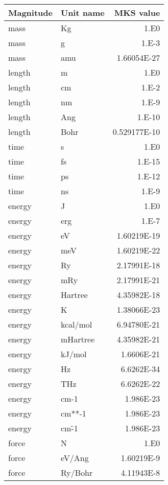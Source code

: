 \documentclass[11pt]{article}
\begin{document}
\begin{center}
\begin{tabular}{llr}
Magnitude & Unit name & MKS value \\
\hline  
mass     & Kg         & 1.E0 \\
mass     & g          & 1.E-3 \\
mass     & amu        & 1.66054E-27 \\
length   & m          & 1.E0 \\
length   & cm         & 1.E-2 \\
length   & nm         & 1.E-9 \\
length   & Ang        & 1.E-10 \\
length   & Bohr       & 0.529177E-10 \\
time     & s          & 1.E0 \\
time     & fs         & 1.E-15 \\
time     & ps         & 1.E-12 \\
time     & ns         & 1.E-9 \\
energy   & J          & 1.E0 \\
energy   & erg        & 1.E-7 \\
energy   & eV         & 1.60219E-19 \\
energy   & meV        & 1.60219E-22 \\
energy   & Ry         & 2.17991E-18 \\
energy   & mRy        & 2.17991E-21 \\
energy   & Hartree    & 4.35982E-18 \\
energy   & K          & 1.38066E-23 \\
energy   & kcal/mol   & 6.94780E-21 \\
energy   & mHartree   & 4.35982E-21 \\
energy   & kJ/mol     & 1.6606E-21 \\
energy   & Hz         & 6.6262E-34 \\
energy   & THz        & 6.6262E-22 \\
energy   & cm-1       & 1.986E-23 \\
energy   & cm**-1     & 1.986E-23 \\
energy   & cm\^-1      & 1.986E-23 \\
force    & N          & 1.E0 \\
force    & eV/Ang     & 1.60219E-9 \\
force    & Ry/Bohr    & 4.11943E-8 \\
\hline
\end{tabular}


\end{center}
\end{document}
